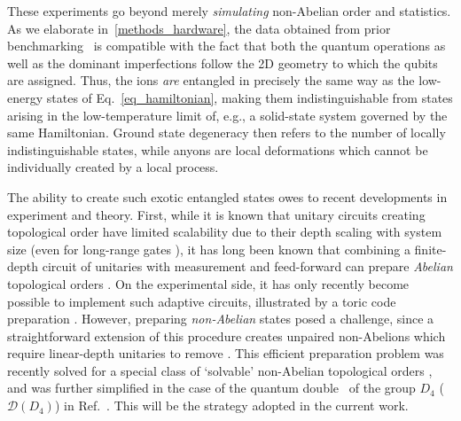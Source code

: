 \documentclass[nofootinbib,pra,twocolumn,showpacs,superscriptaddress,notitlepage,amsmath]{revtex4-2} %
\begin{document}
These experiments go beyond merely \emph{simulating} non-Abelian order and statistics.
As we elaborate in~\ref{methods_hardware}, the data obtained from prior benchmarking~\cite{moses2023race} is compatible with the fact that both the quantum operations as well as the dominant imperfections follow the 2D geometry to which the qubits are assigned. Thus, the ions \emph{are} entangled in precisely the same way as the low-energy states of Eq.~\eqref{eq_hamiltonian}, making them indistinguishable from states arising in the low-temperature limit of, e.g., a solid-state system governed by the same Hamiltonian. Ground state degeneracy then refers to the number of locally indistinguishable states, while anyons are local deformations which cannot be individually created by a local process.

The ability to create such exotic entangled states owes to recent developments in experiment and theory. First, while it is known that unitary circuits creating topological order have limited scalability due to their depth scaling with system size \cite{Bravyi06,Liu21} (even for long-range gates \cite{aharonov2018quantum}), it has long been known that combining a finite-depth circuit of unitaries with measurement and feed-forward can prepare \emph{Abelian} topological orders \cite{Raussendorf05,Bolt16,Piroli21,tantivasadakarn_hierarchy_2022}. On the experimental side, it has only recently become possible to implement such adaptive circuits, illustrated by a toric code preparation \cite{iqbal_topological_2023,Fossfeig23}. However, preparing \emph{non-Abelian} states posed a challenge, since a straightforward extension of this procedure creates unpaired non-Abelions which require linear-depth unitaries to remove \cite{Shi19}. This efficient preparation problem was recently solved for a special class of `solvable’ non-Abelian topological orders \cite{measureSPT,verresen2022efficiently,Bravyi22}, and was further simplified in the case of the quantum double~\cite{kitaev_fault-tolerant_2003} of the group $D_4$ ($\mathcal D(D_4)$) in Ref.~. This will be the strategy adopted in the current work.
\end{document}
